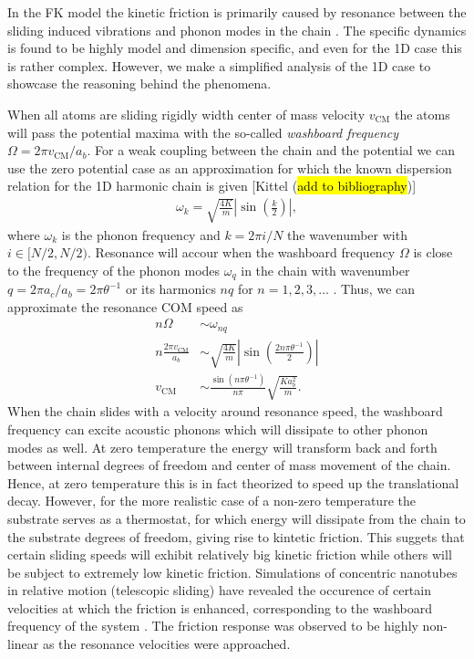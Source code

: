 In the FK model the kinetic friction is primarily caused by resonance between
the sliding induced vibrations and phonon modes in the chain \cite{FK2D}. The specific dynamics is found to be highly model and dimension specific, and even for the 1D case this is rather complex. However, we make a simplified analysis of the 1D case to showcase the reasoning behind the phenomena.

When all atoms are sliding rigidly width center of mass velocity $v_{{\text{CM}}}$ the atoms will pass the potential maxima with the so-called \textit{washboard frequency} $\Omega = 2\pi v_{{\text{CM}}} / a_b$. For a weak coupling between the chain and the potential we can use the zero potential case as an approximation for which the known dispersion relation for the 1D harmonic chain is given [Kittel (\hl{add to bibliography})]
\begin{align*}
  \omega_k = \sqrt{\frac{4 K}{m}} \left|\sin{\left(\frac{k}{2}\right)}\right|,
\end{align*}
where $\omega_k$ is the phonon frequency and $k = 2\pi i / N$ the wavenumber with $i\in [N/2, N/2)$. Resonance will accour when the washboard frequency $\Omega$ is close to the frequency of the phonon modes $\omega_q$ in the chain with wavenumber $q = 2\pi a_c / a_b = 2\pi \theta^{-1}$ or its harmonics $nq$ for $n = 1, 2, 3, \hdots$ \cite{van_den_Ende_2012}. Thus, we can approximate the resonance COM speed as
\begin{align*}
    n \Omega &\sim \omega_{nq} \\
    n \frac{2\pi v_{\text{CM}}}{a_b} &\sim \sqrt{\frac{4K}{m}} \left| \sin{\left(\frac{2n \pi \theta^{-1}}{2}\right)}\right| \\
    v_{\text{CM}} &\sim \frac{\sin{(n\pi \theta^{-1})}}{n \pi} \sqrt{\frac{Ka_b^2}{m}}.
\end{align*}
When the chain slides with a velocity around resonance speed, the washboard
frequency can excite acoustic phonons which will dissipate to other phonon modes
as well. At zero temperature the energy will transform back and forth between
internal degrees of freedom and center of mass movement of the chain. Hence, at
zero temperature this is in fact theorized to speed up the translational decay.
However, for the more realistic case of a non-zero temperature the substrate
serves as a thermostat, for which energy will dissipate from the chain to the
substrate degrees of freedom, giving rise to kintetic friction. This suggets
that certain sliding speeds will exhibit relatively big kinetic friction while
others will be subject to extremely low kinetic friction. Simulations of
concentric nanotubes in relative motion (telescopic sliding) have revealed the
occurence of certain velocities at which the friction is enhanced, corresponding
to the washboard frequency of the system \cite{Manini_2016}. The friction
response was observed to be highly non-linear as the resonance velocities were
approached. 

